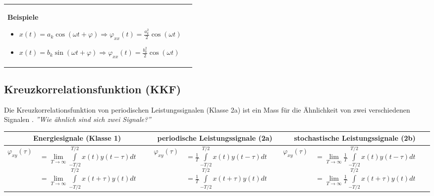 \begin{tabularx}{\textwidth}{lX}
{   			\textbf{Beispiele}
   			\begin{itemize}
     			\item $x(t) = a_k \cos(\omega t + \varphi) \Rightarrow \varphi_{xx}(t) = \frac{a_k^2}{2} \cos(\omega t)$
     			\item $x(t) = b_k \sin(\omega t + \varphi) \Rightarrow \varphi_{xx}(t) = \frac{b_k^2}{2} \cos(\omega t)$
   			\end{itemize}
   		} \\
		\end{tabularx}
				
	\subsection{Kreuzkorrelationsfunktion (KKF) } 
		Die Kreuzkorrelationsfunktion von periodischen Leistungssignalen (Klasse 2a) ist ein Mass für die Ähnlichkeit von zwei verschiedenen Signalen . \textit{''Wie ähnlich sind sich zwei Signale?'' \ }
		\\	
		\bgroup
		\setlength{\tabcolsep}{1mm}
		\begin{tabularx}{\textwidth}{|cX|cX|cX|}
		\hline 
			\multicolumn{2}{|c|}{\textbf{Energiesignale} (Klasse 1)} &
			\multicolumn{2}{|c|}{\textbf{periodische Leistungssignale} (2a)} & 
			\multicolumn{2}{|c|}{\textbf{stochastische Leistungssignale} (2b)}
		\\ \hline 
			$ \varphi_{xy}(\tau) $ &
			$ 		= \lim\limits_{T\to\infty}\int\limits_{-T/2}^{T/2} x(t)y(t-\tau)dt $ \linebreak
				$ 	= \lim\limits_{T\to\infty}\int\limits_{-T/2}^{T/2} x(t+\tau)y(t)dt $ &
			$ \varphi_{xy}(\tau) $ &
			$ 		= \frac {1} {T} \int\limits_{-T/2}^{T/2} x(t)y(t-\tau)dt $ \linebreak
				$	= \frac {1} {T} \int\limits_{-T/2}^{T/2} x(t+\tau)y(t)dt $ &
			$ \varphi_{xy}(\tau) $ &
			$		= \lim\limits_{T\rightarrow\infty} \frac {1} {T} \int\limits_{-T/2}^{T/2} x(t)y(t-\tau)dt $ \linebreak
				$	= \lim\limits_{T\rightarrow\infty}\frac {1} {T} \int\limits_{-T/2}^{T/2} x(t+\tau)y(t)dt $
		\\ \hline
		\end{tabularx} 
		\egroup

